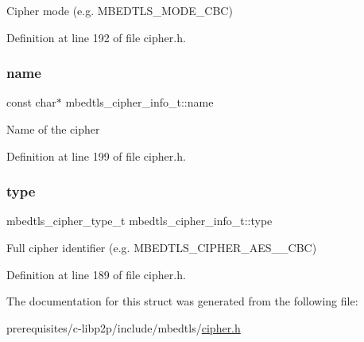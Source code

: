 Cipher mode (e.\+g. M\+B\+E\+D\+T\+L\+S\+\_\+\+M\+O\+D\+E\+\_\+\+C\+BC) 

Definition at line 192 of file cipher.\+h.

\mbox{\label{structmbedtls__cipher__info__t_a7e79a9fb2bd143cc08d59b89b86c9ed7}} 
\subsubsection{\texorpdfstring{name}{name}}
{\footnotesize\ttfamily const char$\ast$ mbedtls\+\_\+cipher\+\_\+info\+\_\+t\+::name}

Name of the cipher 

Definition at line 199 of file cipher.\+h.

\mbox{\label{structmbedtls__cipher__info__t_a399f289efa81ca0da63bc80686b5fe82}} 
\subsubsection{\texorpdfstring{type}{type}}
{\footnotesize\ttfamily mbedtls\+\_\+cipher\+\_\+type\+\_\+t mbedtls\+\_\+cipher\+\_\+info\+\_\+t\+::type}

Full cipher identifier (e.\+g. M\+B\+E\+D\+T\+L\+S\+\_\+\+C\+I\+P\+H\+E\+R\+\_\+\+A\+E\+S\+\_\+\_\+\+C\+BC) 

Definition at line 189 of file cipher.\+h.



The documentation for this struct was generated from the following file\+:\begin{DoxyCompactItemize}
\item 
prerequisites/c-\/libp2p/include/mbedtls/\mbox{\hyperlink{cipher_8h}{cipher.\+h}}\end{DoxyCompactItemize}
